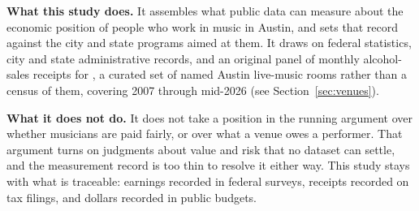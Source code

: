 \vspace{9pt}

\begin{keyfinding}
{\small\textbf{What this study does.} It assembles what public data can measure
about the economic position of people who work in music in Austin, and sets that
record against the city and state programs aimed at them. It draws on
federal statistics, city and state administrative records, and an original panel
of monthly alcohol-sales receipts for \NVenuePanelIsCurated, a curated set of
named Austin live-music rooms rather than a census of them, covering 2007
through mid-2026 (see Section~\ref{sec:venues}).

\smallskip
\textbf{What it does not do.} It does not take a position in the running
argument over whether musicians are paid fairly, or over what a venue owes a
performer. That argument turns on judgments about value and risk that no dataset
can settle, and the measurement record is too thin to resolve it either way.
This study stays with what is traceable: earnings recorded in federal surveys,
receipts recorded on tax filings, and dollars recorded in public budgets.}
\end{keyfinding}

\vspace{4pt}
